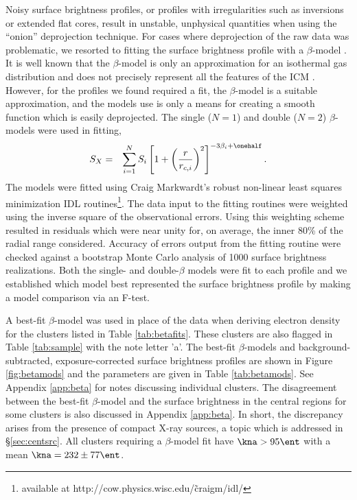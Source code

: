 \documentclass{emulateapj}
\begin{document}
Noisy surface brightness profiles, or profiles with irregularities
such as inversions or extended flat cores, result in unstable,
unphysical quantities when using the ``onion'' deprojection
technique. For cases where deprojection of the raw data was
problematic, we resorted to fitting the surface brightness profile
with a $\beta$-model \citep{1978A&A....70..677C}. It is well known
that the $\beta$-model is only an approximation for an isothermal gas
distribution and does not precisely represent all the features of the
ICM \citep{2000MNRAS.311..313E, 2002ApJ...579..571L,
2007ApJ...665..911H}. However, for the profiles we found required a
fit, the $\beta$-model is a suitable approximation, and the models use
is only a means for creating a smooth function which is easily
deprojected. The single ($N=1$) and double ($N=2$) $\beta$-models were
used in fitting,
\begin{eqnarray}
S_X &=& \displaystyle\sum_{i=1}^N S_i
\left[1+\left(\frac{r}{r_{c,i}}\right)^2\right]^{-3\beta_i+\onehalf}.
\end{eqnarray}
The models were fitted using Craig Markwardt's robust non-linear least
squares minimization IDL routines\footnote{available at
  http://cow.physics.wisc.edu/\~craigm/idl/}. The data input to the
fitting routines were weighted using the inverse square of the
observational errors. Using this weighting scheme resulted in
residuals which were near unity for, on average, the inner 80\% of the
radial range considered. Accuracy of errors output from the fitting
routine were checked against a bootstrap Monte Carlo analysis of 1000
surface brightness realizations. Both the single- and double-$\beta$
models were fit to each profile and we established which model best
represented the surface brightness profile by making a model
comparison via an F-test.

A best-fit $\beta$-model was used in place of the data when deriving
electron density for the clusters listed in Table
\ref{tab:betafits}. These clusters are also flagged in Table
\ref{tab:sample} with the note letter 'a'. The best-fit $\beta$-models
and background-subtracted, exposure-corrected surface brightness
profiles are shown in Figure \ref{fig:betamods} and the parameters are
given in Table \ref{tab:betamods}. See Appendix \ref{app:beta} for
notes discussing individual clusters. The disagreement between the
best-fit $\beta$-model and the surface brightness in the central
regions for some clusters is also discussed in Appendix
\ref{app:beta}. In short, the discrepancy arises from the presence of
compact X-ray sources, a topic which is addressed in
\S\ref{sec:centsrc}. All clusters requiring a $\beta$-model fit have
$\kna > 95 \ent$ with a mean $\kna = 232 \pm 77 \ent$.
\end{document}
